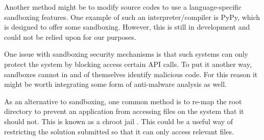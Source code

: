 \documentclass[a4paper,11pt]{report}
\begin{document}
Another method might be to modify source codes to use a language-specific sandboxing features. One example of such an interpreter/compiler is PyPy\cite{pypy_pypy_2016}, which is designed to offer some sandboxing. However, this is still in development and could not be relied upon for our purposes.\par
One issue with sandboxing security mechanisms is that such systems can only protect the system by blocking access certain API calls. To put it another way, sandboxes cannot in and of themselves identify malicious code. For this reason it might be worth integrating some form of anti-malware analysis as well.\par
As an alternative to sandboxing, one common method is to re-map the root directory to prevent an application from accessing files on the system that it should not. This is known as a chroot jail \cite{ubuntu_basic_2016}. This could be a useful way of restricting the solution submitted so that it can only access relevant files.
\end{document}
